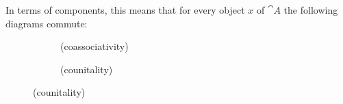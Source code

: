 \begin{definition}[Comonad]
In terms of components, this means that for every object $x$ of $\cat{A}$
the following diagrams commute:

\begin{figure}[H]
\centering
\begin{subfigure}{0.4\textwidth}
\centering
\caption*{(coassociativity)}
\end{subfigure}
\hspace{2em}
\begin{subfigure}{0.4\textwidth}
\centering
\caption*{(counitality)}
\end{subfigure}
\end{figure}

\end{definition}
